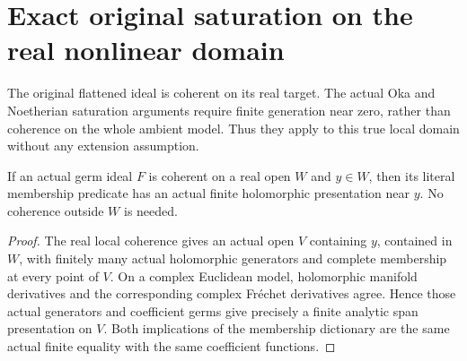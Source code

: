 \section{Exact original saturation on the real nonlinear domain}

The original flattened ideal is coherent on its real target. The actual
Oka and Noetherian saturation arguments require finite generation near
zero, rather than coherence on the whole ambient model. Thus they apply
to this true local domain without any extension assumption.

\begin{lemma}
\label{hir:real-domain-coherence-actual-finite-analytic-presentation}
\leanok
If an actual germ ideal $F$ is coherent on a real open $W$ and $y\in W$,
then its literal membership predicate has an actual finite holomorphic
presentation near $y$. No coherence outside $W$ is needed.
\end{lemma}
\begin{proof}
The real local coherence gives an actual open $V$ containing $y$,
contained in $W$, with finitely many actual holomorphic generators and
complete membership at every point of $V$. On a complex Euclidean
model, holomorphic manifold derivatives and the corresponding complex
Fr\'echet derivatives agree. Hence those actual generators and
coefficient germs give precisely a finite analytic span presentation
on $V$. Both implications of the membership dictionary are the same
actual finite equality with the same coefficient functions.
\end{proof}

